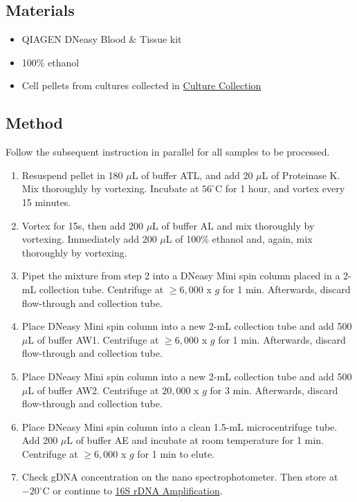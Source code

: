 \documentclass[twocolumn]{article}
\begin{document}
\subsection{Materials}
\begin{itemize}
  \item QIAGEN DNeasy Blood \& Tissue kit
  \item 100\% ethanol
  \item Cell pellets from cultures collected in \hyperref[CC]{Culture Collection}
\end{itemize}

\subsection{Method}
Follow the subsequent instruction in parallel for all samples to be processed.
\begin{enumerate}
  \item Resuspend pellet in 180 $\mu$L of buffer ATL, and add 20 $\mu$L of Proteinase K. Mix thoroughly by vortexing. Incubate at $56^\circ$C for 1 hour, and vortex every 15 minutes.
  \item Vortex for 15s, then add 200 $\mu$L of buffer AL and mix thoroughly by vortexing. Immediately add 200 $\mu$L of 100\% ethanol and, again, mix thoroughly by vortexing.
  \item Pipet the mixture from step 2 into a DNeasy Mini spin column placed in a 2-mL collection tube. Centrifuge at $\geq 6,000$ x $g$ for 1 min. Afterwards, discard flow-through and collection tube.
  \item Place DNeasy Mini spin column into a new 2-mL collection tube and add 500 $\mu$L of buffer AW1. Centrifuge at $\geq 6,000$ x $g$ for 1 min. Afterwards, discard flow-through and collection tube.
  \item Place DNeasy Mini spin column into a new 2-mL collection tube and add 500 $\mu$L of buffer AW2. Centrifuge at $20,000$ x $g$ for 3 min. Afterwards, discard flow-through and collection tube.
  \item Place DNeasy Mini spin column into a clean 1.5-mL microcentrifuge tube. Add 200 $\mu$L of buffer AE and incubate at room temperature for 1 min. Centrifuge at $\geq 6,000$ x $g$ for 1 min to elute.
  \item Check gDNA concentration on the nano spectrophotometer. Then store at $-20^\circ$C or continue to \hyperref[1rA]{16S rDNA Amplification}.
\end{enumerate}
\end{document}
